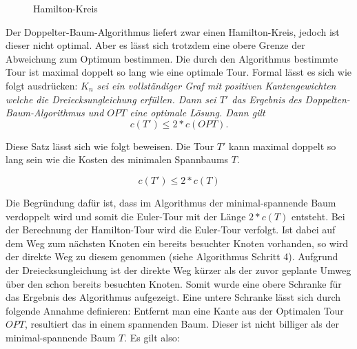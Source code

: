 \documentclass{article}
\begin{document}
\begin{figure}[H]
\centering
{}
\caption{Hamilton-Kreis}
\label{fig:ursprungs-graf-hamiltonkreis}
\end{figure}

Der Doppelter-Baum-Algorithmus liefert zwar einen Hamilton-Kreis, jedoch ist dieser nicht optimal. Aber es lässt sich trotzdem eine obere Grenze der Abweichung zum Optimum bestimmen. Die durch den Algorithmus bestimmte Tour ist maximal doppelt so lang wie eine optimale Tour. Formal lässt es sich wie folgt ausdrücken:
\textit{$K_n$ sei ein vollständiger Graf mit positiven Kantengewichten welche die Dreiecksungleichung erfüllen. Dann sei $T'$ das Ergebnis des Doppelten-Baum-Algorithmus und $OPT$ eine optimale Lösung. Dann gilt
\begin{equation}
c(T') \leq 2 * c(OPT).
\label{eq:test}
\end{equation}}

Diese Satz lässt sich wie folgt beweisen. Die Tour $T'$ kann maximal doppelt so lang sein wie die Kosten des minimalen Spannbaums $T$.

\begin{equation}
c(T') \leq 2 * c(T)
\end{equation}

Die Begründung dafür ist, dass im Algorithmus der minimal-spannende Baum verdoppelt wird und somit die Euler-Tour mit der Länge $2 * c(T)$ entsteht. Bei der Berechnung der Hamilton-Tour wird die Euler-Tour verfolgt. Ist dabei auf dem Weg zum nächsten Knoten ein bereits besuchter Knoten vorhanden, so wird der direkte Weg zu diesem genommen (siehe Algorithmus Schritt 4). Aufgrund der Dreiecksungleichung ist der direkte Weg kürzer als der zuvor geplante Umweg über den schon bereits besuchten Knoten. Somit wurde eine obere Schranke für das Ergebnis des Algorithmus aufgezeigt. Eine untere Schranke lässt sich durch folgende Annahme definieren: Entfernt man eine Kante aus der Optimalen Tour $OPT$, resultiert das in einem spannenden Baum. Dieser ist nicht billiger als der minimal-spannende Baum $T$. Es gilt also:
\end{document}
